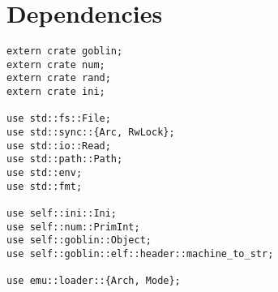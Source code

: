 \documentclass[11pt]{article}
\begin{document}
\section{Dependencies}
\label{sec:orgf631a9b}

\lstset{language=rust,label=org4a95dec,caption= ,captionpos=b,numbers=none}
\begin{lstlisting}
extern crate goblin;
extern crate num;
extern crate rand;
extern crate ini;

use std::fs::File;
use std::sync::{Arc, RwLock};
use std::io::Read;
use std::path::Path;
use std::env;
use std::fmt;

use self::ini::Ini;
use self::num::PrimInt;
use self::goblin::Object;
use self::goblin::elf::header::machine_to_str;

use emu::loader::{Arch, Mode};
\end{lstlisting}
\end{document}

